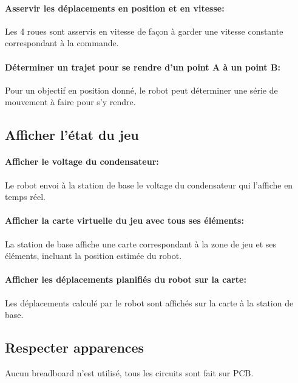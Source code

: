 \paragraph{Asservir les déplacements en position et en vitesse:}

Les 4 roues sont asservis en vitesse de façon à garder une vitesse constante correspondant à la commande.

\paragraph{Déterminer un trajet pour se rendre d'un point A à un point B:}

Pour un objectif en position donné, le robot peut déterminer une série de mouvement à faire pour s'y rendre.

\subsection{Afficher l'état du jeu}

\paragraph{Afficher le voltage du condensateur:}

Le robot envoi à la station de base le voltage du condensateur qui l'affiche en temps réel.

\paragraph{Afficher la carte virtuelle du jeu avec tous ses éléments:}

La station de base affiche une carte correspondant à la zone de jeu et ses éléments, incluant la position estimée du robot.

\paragraph{Afficher les déplacements planifiés du robot sur la carte:}

Les déplacements calculé par le robot sont affichés sur la carte à la station de base.

\subsection{Respecter apparences}

Aucun breadboard n'est utilisé, tous les circuits sont fait sur PCB.

